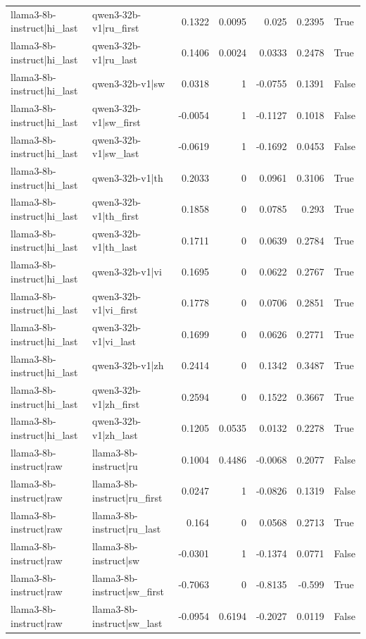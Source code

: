 \begin{table}
\begin{tabular}{l l r r r r l}
llama3-8b-instruct|hi_last & qwen3-32b-v1|ru_first & 0.1322 & 0.0095 & 0.025 & 0.2395 & True \\
llama3-8b-instruct|hi_last & qwen3-32b-v1|ru_last & 0.1406 & 0.0024 & 0.0333 & 0.2478 & True \\
llama3-8b-instruct|hi_last & qwen3-32b-v1|sw & 0.0318 & 1 & -0.0755 & 0.1391 & False \\
llama3-8b-instruct|hi_last & qwen3-32b-v1|sw_first & -0.0054 & 1 & -0.1127 & 0.1018 & False \\
llama3-8b-instruct|hi_last & qwen3-32b-v1|sw_last & -0.0619 & 1 & -0.1692 & 0.0453 & False \\
llama3-8b-instruct|hi_last & qwen3-32b-v1|th & 0.2033 & 0 & 0.0961 & 0.3106 & True \\
llama3-8b-instruct|hi_last & qwen3-32b-v1|th_first & 0.1858 & 0 & 0.0785 & 0.293 & True \\
llama3-8b-instruct|hi_last & qwen3-32b-v1|th_last & 0.1711 & 0 & 0.0639 & 0.2784 & True \\
llama3-8b-instruct|hi_last & qwen3-32b-v1|vi & 0.1695 & 0 & 0.0622 & 0.2767 & True \\
llama3-8b-instruct|hi_last & qwen3-32b-v1|vi_first & 0.1778 & 0 & 0.0706 & 0.2851 & True \\
llama3-8b-instruct|hi_last & qwen3-32b-v1|vi_last & 0.1699 & 0 & 0.0626 & 0.2771 & True \\
llama3-8b-instruct|hi_last & qwen3-32b-v1|zh & 0.2414 & 0 & 0.1342 & 0.3487 & True \\
llama3-8b-instruct|hi_last & qwen3-32b-v1|zh_first & 0.2594 & 0 & 0.1522 & 0.3667 & True \\
llama3-8b-instruct|hi_last & qwen3-32b-v1|zh_last & 0.1205 & 0.0535 & 0.0132 & 0.2278 & True \\
llama3-8b-instruct|raw & llama3-8b-instruct|ru & 0.1004 & 0.4486 & -0.0068 & 0.2077 & False \\
llama3-8b-instruct|raw & llama3-8b-instruct|ru_first & 0.0247 & 1 & -0.0826 & 0.1319 & False \\
llama3-8b-instruct|raw & llama3-8b-instruct|ru_last & 0.164 & 0 & 0.0568 & 0.2713 & True \\
llama3-8b-instruct|raw & llama3-8b-instruct|sw & -0.0301 & 1 & -0.1374 & 0.0771 & False \\
llama3-8b-instruct|raw & llama3-8b-instruct|sw_first & -0.7063 & 0 & -0.8135 & -0.599 & True \\
llama3-8b-instruct|raw & llama3-8b-instruct|sw_last & -0.0954 & 0.6194 & -0.2027 & 0.0119 & False \\

\end{tabular}
\end{table}
